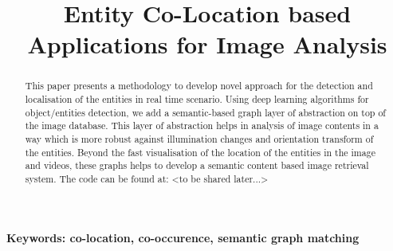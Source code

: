 \documentclass[conference]{IEEEtran}
\begin{document}
%
\title{Entity Co-Location based Applications for Image Analysis}


\author{
\and
{}
}


\maketitle


\begin{abstract}
This paper presents a methodology to develop novel approach for the detection and localisation of the entities in real time scenario. Using deep learning algorithms for object/entities detection, we add a semantic-based graph layer of abstraction on top of the image database. This layer of abstraction helps in analysis of image contents in a way which is more robust against illumination changes and orientation transform of the entities. Beyond the fast visualisation of the location of the entities in the image and videos, these graphs helps to develop a semantic content based image retrieval system. The code can be found at: <to be shared later...>

\end{abstract}


\textbf{Keywords: co-location, co-occurence, semantic graph matching}
\end{document}
